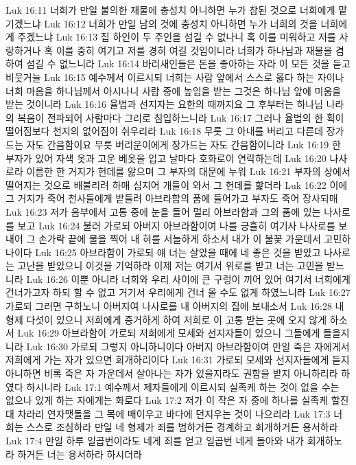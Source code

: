 Luk 16:11  너희가 만일 불의한 재물에 충성치 아니하면 누가 참된 것으로 너희에게 맡기겠느냐
Luk 16:12  너희가 만일 남의 것에 충성치 아니하면 누가 너희의 것을 너희에게 주겠느냐
Luk 16:13  집 하인이 두 주인을 섬길 수 없나니 혹 이를 미워하고 저를 사랑하거나 혹 이를 중히 여기고 저를 경히 여길 것임이니라 너희가 하나님과 재물을 겸하여 섬길 수 없느니라
Luk 16:14  바리새인들은 돈을 좋아하는 자라 이 모든 것을 듣고 비웃거늘
Luk 16:15  예수께서 이르시되 너희는 사람 앞에서 스스로 옳다 하는 자이나 너희 마음을 하나님께서 아시나니 사람 중에 높임을 받는 그것은 하나님 앞에 미움을 받는 것이니라
Luk 16:16  율법과 선지자는 요한의 때까지요 그 후부터는 하나님 나라의 복음이 전파되어 사람마다 그리로 침입하느니라
Luk 16:17  그러나 율법의 한 획이 떨어짐보다 천지의 없어짐이 쉬우리라
Luk 16:18  무릇 그 아내를 버리고 다른데 장가드는 자도 간음함이요 무릇 버리운이에게 장가드는 자도 간음함이니라
Luk 16:19  한 부자가 있어 자색 옷과 고운 베옷을 입고 날마다 호화로이 연락하는데
Luk 16:20  나사로라 이름한 한 거지가 헌데를 앓으며 그 부자의 대문에 누워
Luk 16:21  부자의 상에서 떨어지는 것으로 배불리려 하매 심지어 개들이 와서 그 헌데를 핥더라
Luk 16:22  이에 그 거지가 죽어 천사들에게 받들려 아브라함의 품에 들어가고 부자도 죽어 장사되매
Luk 16:23  저가 음부에서 고통 중에 눈을 들어 멀리 아브라함과 그의 품에 있는 나사로를 보고
Luk 16:24  불러 가로되 아버지 아브라함이여 나를 긍휼히 여기사 나사로를 보내어 그 손가락 끝에 물을 찍어 내 혀를 서늘하게 하소서 내가 이 불꽃 가운데서 고민하나이다
Luk 16:25  아브라함이 가로되 얘 너는 살았을 때에 네 좋은 것을 받았고 나사로는 고난을 받았으니 이것을 기억하라 이제 저는 여기서 위로를 받고 너는 고민을 받느니라
Luk 16:26  이뿐 아니라 너희와 우리 사이에 큰 구렁이 끼어 있어 여기서 너희에게 건너가고자 하되 할 수 없고 거기서 우리에게 건너 올 수도 없게 하였느니라
Luk 16:27  가로되 그러면 구하노니 아버지여 나사로를 내 아버지의 집에 보내소서
Luk 16:28  내 형제 다섯이 있으니 저희에게 증거하게 하여 저희로 이 고통 받는 곳에 오지 않게 하소서
Luk 16:29  아브라함이 가로되 저희에게 모세와 선지자들이 있으니 그들에게 들을지니라
Luk 16:30  가로되 그렇지 아니하니이다 아버지 아브라함이여 만일 죽은 자에게서 저희에게 가는 자가 있으면 회개하리이다
Luk 16:31  가로되 모세와 선지자들에게 듣지 아니하면 비록 죽은 자 가운데서 살아나는 자가 있을지라도 권함을 받지 아니하리라 하였다 하시니라
Luk 17:1  예수께서 제자들에게 이르시되 실족케 하는 것이 없을 수는 없으나 있게 하는 자에게는 화로다
Luk 17:2  저가 이 작은 자 중에 하나를 실족케 할진대 차라리 연자맷돌을 그 목에 매이우고 바다에 던지우는 것이 나으리라
Luk 17:3  너희는 스스로 조심하라 만일 네 형제가 죄를 범하거든 경계하고 회개하거든 용서하라
Luk 17:4  만일 하루 일곱번이라도 네게 죄를 얻고 일곱번 네게 돌아와 내가 회개하노라 하거든 너는 용서하라 하시더라
